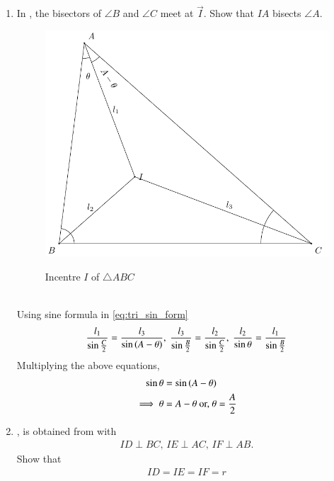 %
\begin{enumerate}[label=\thesubsection.\arabic*.,ref=\thesubsection.\theenumi]
\item  In  
	, the bisectors of $\angle B$ and $\angle C$	 meet at $\vec{I}$.
Show that $IA$ bisects $\angle A$.
\begin{figure}[!ht]
	\begin{center}
		
		{\includegraphics[width=0.6\columnwidth]{figs/trig_id/angbis/tri-icentre.pdf}}
	\end{center}
	\caption{Incentre $I$ of $\triangle ABC$}
	\label{fig:tri_icentre}	
\end{figure}
\\
\solution
Using sine formula
in
\eqref{eq:tri_sin_form}
  \begin{align}
  \frac{l_1}{\sin\frac{C}{2}}
  = 
   \frac{l_3}{\sin \left(A-\theta\right)}
  ,\
   \frac{l_3}{\sin\frac{B}{2}}
=\frac{l_2}{\sin\frac{C}{2}}
  ,\
\frac{l_2}{\sin \theta}
	  =
  \frac{l_1}{\sin\frac{B}{2}}
  \end{align}
  Multiplying the above equations, 
  \begin{align}
  \sin \theta &= \sin \left(A - \theta\right)
  \\
	  \implies \theta &=A - \theta 
	  \text{ or, } \theta = \frac{A}{2}
  \end{align}
  \item 
	, 
	is obtained from 
	with
  \begin{align}
	  ID \perp BC, \, 
	  IE \perp AC, \, 
	  IF \perp AB.
  \end{align}
  Show that 
  \begin{align}
	  ID=   
	  IE= 
	  IF=r 
	\label{eq:tri_iradius}	
  \end{align}
		\begin{figure}[!ht]
	\begin{center}

\end{center}
\end{figure}
\end{enumerate}
